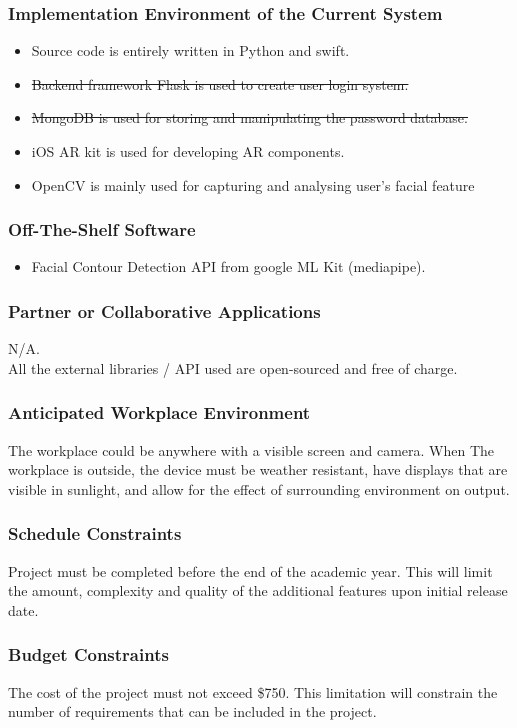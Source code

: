 \documentclass[12pt]{article}
\begin{document}
\subsubsection{Implementation Environment of the Current System}
\begin{itemize}
    \item Source code is entirely written in Python and swift.
    \item \sout{Backend framework Flask is used to create user login system.}
    \item \sout{MongoDB is used for storing and manipulating the password database.}
    \item iOS AR kit is used for developing AR components.
    \item OpenCV is mainly used for capturing and analysing user's facial feature
\end{itemize}
\subsubsection{Off-The-Shelf Software}
\begin{itemize}
    \item Facial Contour Detection API from google ML Kit (mediapipe).
\end{itemize}
\subsubsection{Partner or Collaborative Applications}
N/A. \\All the external libraries / API used are open-sourced and free of charge.
\subsubsection{Anticipated Workplace Environment}
The workplace could be anywhere with a visible screen and camera. When The workplace is outside, the device must be weather resistant, have displays that are visible in sunlight, and allow for the effect of surrounding environment on output.
\subsubsection{Schedule Constraints}
Project must be completed before the end of the academic year. This will limit the amount, complexity and quality of the additional features upon initial release date.
\subsubsection{Budget Constraints}
The cost of the project must not exceed \$750. This limitation will constrain the number of requirements that can be included in the project.
  
\end{document}
